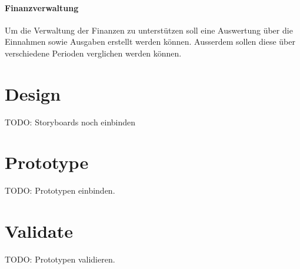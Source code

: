 \documentclass[a4paper]{scrreprt}
\begin{document}
\paragraph{Finanzverwaltung}
Um die Verwaltung der Finanzen zu unterstützen soll eine Auswertung über die Einnahmen sowie Ausgaben erstellt werden können. Ausserdem sollen diese über verschiedene Perioden verglichen werden können.


\section{Design}
TODO: Storyboards noch einbinden


\section{Prototype}
TODO: Prototypen einbinden.


\section{Validate}
TODO: Prototypen validieren.
\end{document}

